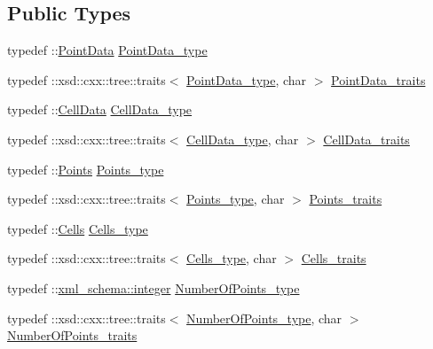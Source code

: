 \subsection*{Public Types}
\begin{DoxyCompactItemize}
\item 
typedef \+::\hyperlink{classPointData}{Point\+Data} \hyperlink{classPieceUnstructuredGrid__t_a5d79d8ea03ca53f80f24e62c2175ec02}{Point\+Data\+\_\+type}
\item 
typedef \+::xsd\+::cxx\+::tree\+::traits$<$ \hyperlink{classPieceUnstructuredGrid__t_a5d79d8ea03ca53f80f24e62c2175ec02}{Point\+Data\+\_\+type}, char $>$ \hyperlink{classPieceUnstructuredGrid__t_aee3c7ac7c46c4ebc9f248d31c458d300}{Point\+Data\+\_\+traits}
\item 
typedef \+::\hyperlink{classCellData}{Cell\+Data} \hyperlink{classPieceUnstructuredGrid__t_a4232a7b88477ee6f692a4e5fab6a65d1}{Cell\+Data\+\_\+type}
\item 
typedef \+::xsd\+::cxx\+::tree\+::traits$<$ \hyperlink{classPieceUnstructuredGrid__t_a4232a7b88477ee6f692a4e5fab6a65d1}{Cell\+Data\+\_\+type}, char $>$ \hyperlink{classPieceUnstructuredGrid__t_a0e04d369c16993da7e5e2a7152c2e518}{Cell\+Data\+\_\+traits}
\item 
typedef \+::\hyperlink{classPoints}{Points} \hyperlink{classPieceUnstructuredGrid__t_a7747b159a3d1eee8d02a0eefaa235711}{Points\+\_\+type}
\item 
typedef \+::xsd\+::cxx\+::tree\+::traits$<$ \hyperlink{classPieceUnstructuredGrid__t_a7747b159a3d1eee8d02a0eefaa235711}{Points\+\_\+type}, char $>$ \hyperlink{classPieceUnstructuredGrid__t_abdfd9c9f9eb5f43bd4cfcb2fad6d9f63}{Points\+\_\+traits}
\item 
typedef \+::\hyperlink{classCells}{Cells} \hyperlink{classPieceUnstructuredGrid__t_aca1ec38eff08bde0cd115c54dbb7a20f}{Cells\+\_\+type}
\item 
typedef \+::xsd\+::cxx\+::tree\+::traits$<$ \hyperlink{classPieceUnstructuredGrid__t_aca1ec38eff08bde0cd115c54dbb7a20f}{Cells\+\_\+type}, char $>$ \hyperlink{classPieceUnstructuredGrid__t_a33252b6f55b5ae830ceecdf9be42cce1}{Cells\+\_\+traits}
\item 
typedef \+::\hyperlink{namespacexml__schema_aaaea7c8ce4dfbe26cc52c91c29c97b7c}{xml\+\_\+schema\+::integer} \hyperlink{classPieceUnstructuredGrid__t_a8df1cd0d138d990e166d325ceed9a660}{Number\+Of\+Points\+\_\+type}
\item 
typedef \+::xsd\+::cxx\+::tree\+::traits$<$ \hyperlink{classPieceUnstructuredGrid__t_a8df1cd0d138d990e166d325ceed9a660}{Number\+Of\+Points\+\_\+type}, char $>$ \hyperlink{classPieceUnstructuredGrid__t_acdfbb1dc264a5a48bcc6d4aa815db003}{Number\+Of\+Points\+\_\+traits}

\end{DoxyCompactItemize}
